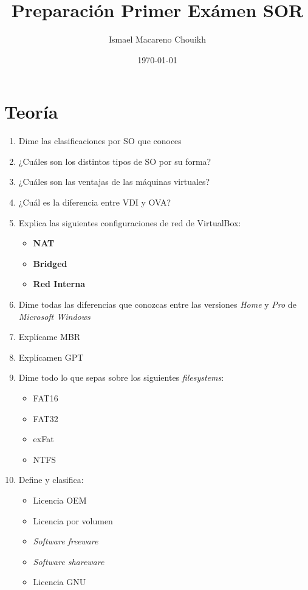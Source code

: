 \documentclass[11pt]{article}
\author{Ismael Macareno Chouikh}
\date{\today}
\title{Preparación Primer Exámen SOR}
\newcommand\blankpage{\null\thispagestyle{empty}\newpage}
\begin{document}
\maketitle
\tableofcontents

\blankpage

\section{Teoría}
\label{sec:orgcbfe698}
\begin{enumerate}
\item Dime las clasificaciones por SO que conoces
\item ¿Cuáles son los distintos tipos de SO por su forma?
\item ¿Cuáles son las ventajas de las máquinas virtuales?
\item ¿Cuál es la diferencia entre VDI y OVA?
\item Explica las siguientes configuraciones de red de VirtualBox:
\begin{itemize}
\item \textbf{NAT}
\item \textbf{Bridged}
\item \textbf{Red Interna}
\end{itemize}
\item Dime todas las diferencias que conozcas entre las versiones \emph{Home} y \emph{Pro} de \emph{Microsoft Windows}
\item Explícame MBR
\item Explícamen GPT
\item Dime todo lo que sepas sobre los siguientes \emph{filesystems}:
\begin{itemize}
\item FAT16
\item FAT32
\item exFat
\item NTFS
\end{itemize}
\item Define y clasifica:
\begin{itemize}
\item Licencia OEM
\item Licencia por volumen
\item \emph{Software freeware}
\item \emph{Software shareware}
\item Licencia GNU
\end{itemize}
\end{enumerate}
\end{document}
